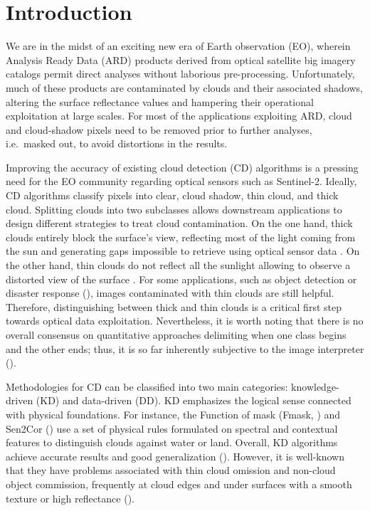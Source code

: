 \documentclass[a4paper, nobind]{templates/cdethesis}
\begin{document}
\minitoc 

\hypertarget{introduction}{%
\section{Introduction}\label{introduction}}

We are in the midst of an exciting new era of Earth observation (EO), wherein Analysis Ready Data (ARD) \autocite{Mahecha2020,Giuliani2019,Gomes2020} products derived from optical satellite big imagery catalogs permit direct analyses without laborious pre-processing. Unfortunately, much of these products are contaminated by clouds \autocite{Wilson2016} and their associated shadows, altering the surface reflectance values and hampering their operational exploitation at large scales. For most of the applications exploiting ARD, cloud and cloud-shadow pixels need to be removed prior to further analyses, i.e.~masked out, to avoid distortions in the results.

Improving the accuracy of existing cloud detection (CD) algorithms is a pressing need for the EO community regarding optical sensors such as Sentinel-2. Ideally, CD algorithms classify pixels into clear, cloud shadow, thin cloud, and thick cloud. Splitting clouds into two subclasses allows downstream applications to design different strategies to treat cloud contamination. On the one hand, thick clouds entirely block the surface's view, reflecting most of the light coming from the sun and generating gaps impossible to retrieve using optical sensor data \autocite{Ebel2020a}. On the other hand, thin clouds do not reflect all the sunlight allowing to observe a distorted view of the surface \autocite{lynch2002cirrus,chen2017}. For some applications, such as object detection or disaster response (\cite{Mateo-Garcia2021}), images contaminated with thin clouds are still helpful. Therefore, distinguishing between thick and thin clouds is a critical first step towards optical data exploitation. Nevertheless, it is worth noting that there is no overall consensus on quantitative approaches delimiting when one class begins and the other ends; thus, it is so far inherently subjective to the image interpreter (\cite{Qiu2020, Foga2017}).

Methodologies for CD can be classified into two main categories: knowledge-driven (KD) and data-driven (DD). KD emphasizes the logical sense connected with physical foundations. For instance, the Function of mask (Fmask, \cite{Qiu2019}) and Sen2Cor (\cite{Qiu2019}) use a set of physical rules formulated on spectral and contextual features to distinguish clouds against water or land. Overall, KD algorithms achieve accurate results and good generalization (\cite{Sanchez2020, Zekoll2021, Cilli}). However, it is well-known that they have problems associated with thin cloud omission and non-cloud object commission, frequently at cloud edges and under surfaces with a smooth texture or high reflectance (\cite{Melchiorre2020, Stillinger2019}).
\end{document}
